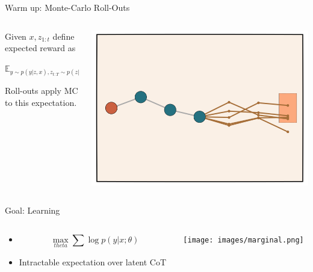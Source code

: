 \documentclass[14pt,aspectratio=169]{beamer}
\begin{document}
\begin{frame}{Warm up: Monte-Carlo Roll-Outs}
	\begin{columns}
		\begin{column}{0.5\linewidth}
			Given $x, z_{1:t}$ define expected reward as

			$\mathbb{E}_{y\sim p(y| z, x), z_{t:T} \sim p(z | z_{1:t}, x)}[Ver(y)]$

			Roll-outs apply MC to this expectation.
		\end{column}
		\begin{column}{0.5\linewidth}
			\includegraphics[width=\textwidth]{images/mcroll.png}
		\end{column}
	\end{columns}
\end{frame}



\begin{frame}{Goal: Learning}
	\begin{columns}
		\begin{column}{0.5\linewidth}
			\begin{itemize}
				\item $$\max_{theta} \sum \log p(y | x; \theta)$$
				\item Intractable expectation over latent CoT
			\end{itemize}
		\end{column}
		\begin{column}{0.5\linewidth}
			\texttt{[image: images/marginal.png]}
		\end{column}
	\end{columns}
\end{frame}
\end{document}
